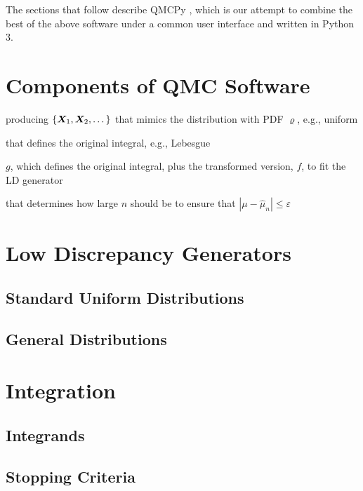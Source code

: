\documentclass[graybox,footinfo]{svmult}
\newcommand{\hmu}{\widehat{\mu}}
\newcommand{\abs}[1]{\left \lvert #1 \right \rvert}
\begin{document}
The sections that follow describe QMCPy \cite{QMCPy2020a}, which is our attempt to combine the best of the above software under a common user interface and written in Python 3.  


\section{Components of QMC Software}


\begin{description}
	\setlength{\itemsep}{0.5cm}
	
	\item[LD Generator] producing $\{{\boldsymbol{X}}_1, {\boldsymbol{X}}_2, \dots \}$ that mimics the distribution with PDF $\varrho$, e.g., uniform
	
	\item[True Measure] that defines the original integral, e.g., Lebesgue
	
	\item[Integrand] $g$, which defines the original integral, plus the transformed version, $f$, to fit the LD generator
	
	\item[Stopping Criterion] that determines how large $n$ should be to ensure that $\abs{\mu - \hmu_n} \le \varepsilon$
\end{description}


\section{Low Discrepancy Generators}

\subsection{Standard Uniform Distributions}

\subsection{General Distributions}

\section{Integration}

\subsection{Integrands}

\subsection{Stopping Criteria}
\end{document}
